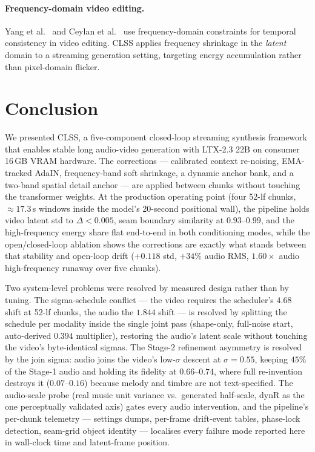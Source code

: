\documentclass[12pt]{article}
\begin{document}
\paragraph{Frequency-domain video editing.}
Yang et al.~\cite{yang2024fresco} and Ceylan et al.~\cite{ceylan2023pix2video}
use frequency-domain constraints for temporal consistency in video editing.
CLSS applies frequency shrinkage in the \emph{latent} domain to a streaming
generation setting, targeting energy accumulation rather than pixel-domain
flicker.

\section{Conclusion}
\label{sec:conclusion}

We presented CLSS, a five-component closed-loop streaming synthesis framework
that enables stable long audio-video generation with LTX-2.3 22B on consumer
16\,GB VRAM hardware.  The corrections --- calibrated context re-noising,
EMA-tracked AdaIN, frequency-band soft shrinkage, a dynamic anchor bank, and a
two-band spatial detail anchor --- are applied between chunks without touching
the transformer weights.  At the production operating point (four 52-lf
chunks, $\approx17.3$\,s windows inside the model's 20-second positional
wall), the pipeline holds video latent std to $\Delta<0.005$, seam boundary
similarity at $0.93$--$0.99$, and the high-frequency energy share flat
end-to-end in both conditioning modes, while the open/closed-loop ablation
shows the corrections are exactly what stands between that stability and
open-loop drift ($+0.118$ std, $+34\%$ audio RMS, $1.60\times$ audio
high-frequency runaway over five chunks).

Two system-level problems were resolved by measured design rather than by
tuning.  The sigma-schedule conflict --- the video requires the scheduler's
$4.68$ shift at 52-lf chunks, the audio the $1.844$ shift --- is resolved by
splitting the schedule per modality inside the single joint pass (shape-only,
full-noise start, auto-derived $0.394$ multiplier), restoring the audio's
latent scale without touching the video's byte-identical sigmas.  The
Stage-2 refinement asymmetry is resolved by the join sigma: audio joins the
video's low-$\sigma$ descent at $\sigma=0.55$, keeping $45\%$ of the
Stage-1 audio and holding its fidelity at $0.66$--$0.74$, where full
re-invention destroys it ($0.07$--$0.16$) because melody and timbre are not
text-specified.  The audio-scale probe (real music unit variance vs.\
generated half-scale, dynR as the one perceptually validated axis) gates every audio
intervention, and the pipeline's per-chunk telemetry --- settings dumps,
per-frame drift-event tables, phase-lock detection, seam-grid object
identity --- localises every failure mode reported here in wall-clock time
and latent-frame position.
\end{document}
